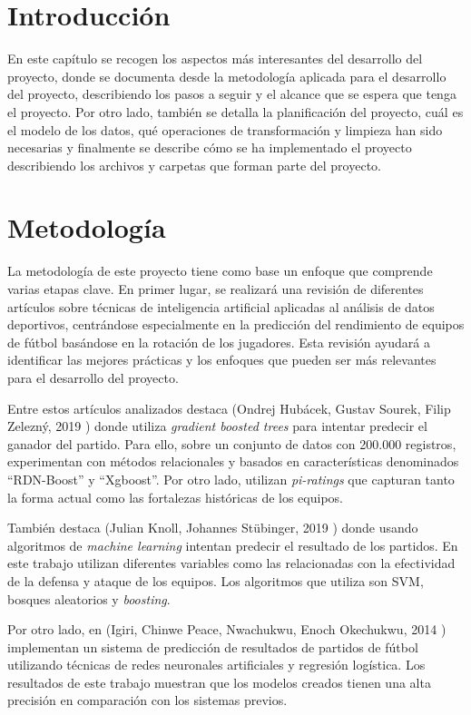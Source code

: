 


\section{Introducción}
En este capítulo se recogen los aspectos más interesantes del desarrollo del proyecto, donde se documenta desde la metodología aplicada para el desarrollo del proyecto, describiendo los pasos a seguir y el alcance que se espera que tenga el proyecto. Por otro lado, también se detalla la planificación del proyecto, cuál es el modelo de los datos, qué operaciones de transformación y limpieza han sido necesarias y finalmente se describe cómo se ha implementado el proyecto describiendo los archivos y carpetas que forman parte del proyecto.


\section{Metodología}
La metodología de este proyecto tiene como base un enfoque que comprende varias etapas clave. En primer lugar, se realizará una revisión de diferentes artículos sobre técnicas de inteligencia artificial aplicadas al análisis de datos deportivos, centrándose especialmente en la predicción del rendimiento de equipos de fútbol basándose en la rotación de los jugadores. Esta revisión ayudará a identificar las mejores prácticas y los enfoques que pueden ser más relevantes para el desarrollo del proyecto.

Entre estos artículos analizados destaca (Ondrej Hubácek, Gustav Sourek, Filip Zelezný, 2019 \cite{rusos}) donde utiliza \textit{gradient boosted trees} para intentar predecir el ganador del partido. Para ello, sobre un conjunto de datos con 200.000 registros, experimentan con métodos relacionales y basados en características denominados ``RDN-Boost'' y ``Xgboost''. Por otro lado, utilizan \textit{pi-ratings} que capturan tanto la forma actual como las fortalezas históricas de los equipos.

También destaca (Julian Knoll, Johannes Stübinger, 2019 \cite{alemanes}) donde usando algoritmos de \textit{machine learning} intentan predecir el resultado de los partidos. En este trabajo utilizan diferentes variables como las relacionadas con la efectividad de la defensa y ataque de los equipos. Los algoritmos que utiliza son SVM, bosques aleatorios y \textit{boosting}.

Por otro lado, en (Igiri, Chinwe Peace, Nwachukwu, Enoch Okechukwu, 2014 \cite{africanos}) implementan un sistema de predicción de resultados de partidos de fútbol utilizando técnicas de redes neuronales artificiales y regresión logística. Los resultados de este trabajo muestran que los modelos creados tienen una alta precisión en comparación con los sistemas previos.

